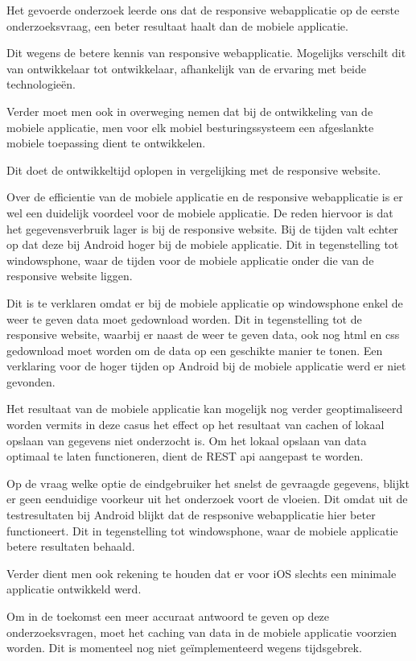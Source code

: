 Het gevoerde onderzoek leerde ons dat de responsive webapplicatie op de eerste onderzoeksvraag, een beter resultaat haalt dan de mobiele applicatie.

Dit wegens de betere kennis van responsive webapplicatie. Mogelijks verschilt dit van ontwikkelaar tot ontwikkelaar,
afhankelijk van de ervaring met beide technologieën.

Verder moet men ook in overweging nemen dat bij de ontwikkeling van de mobiele applicatie, men voor elk mobiel besturingssysteem een afgeslankte mobiele toepassing dient te ontwikkelen.

Dit doet de ontwikkeltijd oplopen in vergelijking met de responsive website.

Over de efficientie van de mobiele applicatie en de responsive webapplicatie is er wel een duidelijk voordeel voor de mobiele applicatie.
De reden hiervoor is dat het gegevensverbruik lager is bij de responsive website.
Bij de tijden valt echter op dat deze bij Android hoger bij de mobiele applicatie. Dit in tegenstelling tot windowsphone, waar de tijden voor de mobiele applicatie onder die van de responsive website liggen.

Dit is te verklaren omdat er bij de mobiele applicatie op windowsphone enkel de weer te geven data moet gedownload worden. Dit in tegenstelling tot de responsive website, waarbij er naast de weer te geven data, ook nog html
en css gedownload moet worden om de data op een geschikte manier te tonen. Een verklaring voor de hoger tijden op Android bij de mobiele applicatie werd er niet gevonden.

Het resultaat van de mobiele applicatie kan mogelijk nog verder geoptimaliseerd worden vermits in deze casus het effect op het resultaat van cachen of lokaal opslaan van gegevens niet onderzocht is.
Om het lokaal opslaan van data optimaal te laten functioneren, dient de REST api aangepast te worden.

Op de vraag welke optie de eindgebruiker het snelst de gevraagde gegevens, blijkt er geen eenduidige voorkeur uit het onderzoek voort de vloeien.
Dit omdat uit de testresultaten bij Android blijkt dat de respsonive webapplicatie hier beter functioneert. Dit in tegenstelling tot windowsphone, waar de mobiele applicatie betere
resultaten behaald.

Verder dient men ook rekening te houden dat er voor iOS slechts een minimale applicatie ontwikkeld werd.

Om in de toekomst een meer accuraat antwoord te geven op deze onderzoeksvragen, moet het caching van data in de mobiele applicatie voorzien worden.
Dit is momenteel nog niet geïmplementeerd wegens tijdsgebrek.
